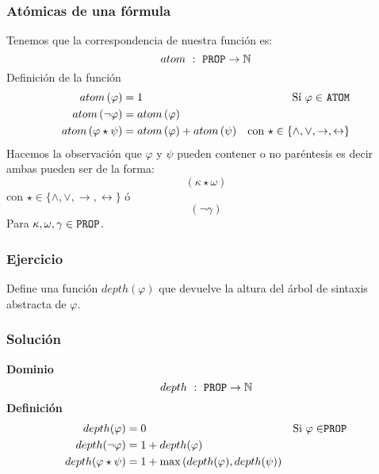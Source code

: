 \documentclass[a4paper]{article}
\begin{document}
\subsubsection{Atómicas de una fórmula}
\noindent
Tenemos que la correspondencia de nuestra función es:
\[
      atom \ : \ \text{\texttt{PROP}} \to \mathbb{N}
\]
Definición de la función
\begin{align*}
    atom\left(\varphi\right) &= 1 &\text{Sí \(\varphi \in\) \texttt{ATOM}} \\
    atom\left(\neg \varphi\right) &= atom\left(\varphi\right) & \\
    atom\left(\varphi \star \psi \right) &= atom\left(\varphi\right) + atom\left(\psi\right) & \text{con \(\star \in \{\land, \lor, \rightarrow, \leftrightarrow \}\)} \\
\end{align*}
Hacemos la observación que \(\varphi\) y \(\psi\) pueden contener o no paréntesis es decir ambas pueden ser de la forma:
\[
    \left(\kappa \star \omega \right)  
\]
con \(\star \in \{ \land, \lor, \rightarrow, \leftrightarrow \}\) ó
\[
    \left(\neg \gamma\right)
\]
Para \(\kappa, \omega, \gamma \in \text{\texttt{PROP}}\).
\subsubsection{Ejercicio}
\noindent
Define una función \(depth\left(\varphi\right)\) que devuelve la altura del árbol de sintaxis abstracta de \(\varphi\).
\subsubsection{Solución}
\textbf{Dominio}
\[
    depth \ : \ \text{\texttt{PROP}} \to \mathbb{N}
\]
\textbf{Definición}
\begin{align*}
    depth(\varphi) &= 0 &\text{Si \(\varphi \in\)\texttt{PROP}} \\
    depth(\neg \varphi) &= 1 + depth(\varphi) & \\
    depth(\varphi \star \psi) &= 1 + \max{(depth(\varphi), depth(\psi))} &
\end{align*}
\end{document}
